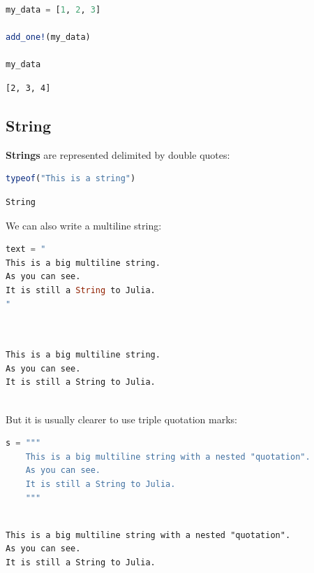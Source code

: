 \documentclass[
  notoc %
]{tufte-book}
\begin{document}
\begin{lstlisting}[language=Julia]
my_data = [1, 2, 3]

add_one!(my_data)

my_data
\end{lstlisting}

\begin{lstlisting}[language=Output]
[2, 3, 4]
\end{lstlisting}

\hypertarget{sec:string}{%
\subsection{String}\label{sec:string}}

\textbf{Strings} are represented delimited by double quotes:

\begin{lstlisting}[language=Julia]
typeof("This is a string")
\end{lstlisting}

\begin{lstlisting}[language=Output]
String
\end{lstlisting}

We can also write a multiline string:

\begin{lstlisting}[language=Julia]
text = "
This is a big multiline string.
As you can see.
It is still a String to Julia.
"
\end{lstlisting}

\begin{lstlisting}[language=Output]


This is a big multiline string.
As you can see.
It is still a String to Julia.


\end{lstlisting}

But it is usually clearer to use triple quotation marks:

\begin{lstlisting}[language=Julia]
s = """
    This is a big multiline string with a nested "quotation".
    As you can see.
    It is still a String to Julia.
    """
\end{lstlisting}

\begin{lstlisting}[language=Output]

This is a big multiline string with a nested "quotation".
As you can see.
It is still a String to Julia.


\end{lstlisting}
\end{document}
